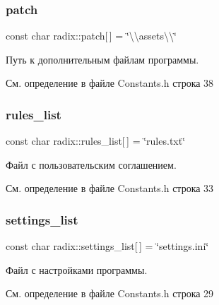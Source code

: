 \subsubsection{\texorpdfstring{patch}{patch}}
{\footnotesize\ttfamily const char radix\+::patch\mbox{[}$\,$\mbox{]} = \char`\"{}\textbackslash{}\textbackslash{}assets\textbackslash{}\textbackslash{}\char`\"{}}

Путь к дополнительным файлам программы. 

См. определение в файле Constants.\+h строка 38

\mbox{\label{namespaceradix_a73b088a3e903cc2845c2299b9ab8ccaf}} 
\subsubsection{\texorpdfstring{rules\+\_\+list}{rules\_list}}
{\footnotesize\ttfamily const char radix\+::rules\+\_\+list\mbox{[}$\,$\mbox{]} = \char`\"{}rules.\+txt\char`\"{}}

Файл с пользовательским соглашением. 

См. определение в файле Constants.\+h строка 33

\mbox{\label{namespaceradix_a43bff57dbd1b7dcebee0228ccbab7f17}} 
\subsubsection{\texorpdfstring{settings\+\_\+list}{settings\_list}}
{\footnotesize\ttfamily const char radix\+::settings\+\_\+list\mbox{[}$\,$\mbox{]} = \char`\"{}settings.\+ini\char`\"{}}

Файл с настройками программы. 

См. определение в файле Constants.\+h строка 29

